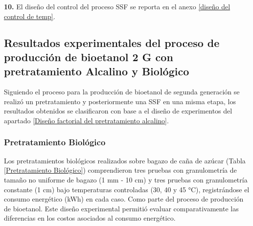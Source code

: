 \documentclass[12pt]{article}
\begin{document}
	     	
	     	\textbf{10.} El diseño del control del proceso SSF se reporta en el anexo \ref{diseño del control de temp}.
	     	
	     	
			
			
		

				\subsection{Resultados experimentales del proceso de producción de bioetanol 2 G con pretratamiento Alcalino  y Biológico}
				Siguiendo el proceso para la producción de bioetanol de segunda generación se realizó un pretratamiento y posteriormente una SSF en una misma etapa, los resultados obtenidos se clasificaron con base a el diseño de experimentos del apartado \ref{Diseño factorial del pretratamiento alcalino}.
				
				
				
		
		\subsubsection{Pretratamiento Biológico}
	Los pretratamientos biológicos realizados sobre bagazo de caña de azúcar (Tabla \ref{Pretratamiento Biológico}) comprendieron tres pruebas con granulometría de tamaño no uniforme de bagazo (1 mm - 10 cm) y tres pruebas con granulometría constante (1 cm) bajo temperaturas controladas (30, 40 y 45 °C), registrándose el consumo energético (kWh) en cada caso. Como parte del proceso de producción de bioetanol.  Este diseño experimental permitió evaluar comparativamente las diferencias en los costos asociados al consumo energético. 
		
\end{document}
